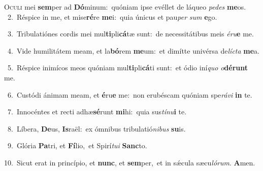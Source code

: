 \lettrine{\initial\textcolor{\initialcolor}{O}}{culi} mei \textbf{sem}\-per ad \textbf{Dó}\-minum:~\star quóniam ipse evéllet de láqueo \textit{pe}\-\textit{des} \textbf{me}\-os.\\
{\numbfont\textcolor{\numbcolor}{~2.}}~Réspice in me, et mise\-\textbf{ré}\-re \textbf{me}\-i:~\star quia únicus et pau\textit{per} \textit{sum} \textbf{e}\-go.\par
{\numbfont\textcolor{\numbcolor}{~3.}}~Tribulatiónes cordis mei mul\-\textbf{ti}\-pli\-\textbf{cá}\-tæ sunt:~\star de necessitátibus meis \textit{é}\-\textit{ru}\textbf{e} me.\par
{\numbfont\textcolor{\numbcolor}{~4.}}~Vide humilitátem meam, et la\-\textbf{bó}\-rem \textbf{me}\-um:~\star et dimítte univérsa de\-\textit{líc}\-\textit{ta} \textbf{me}\-a.\par
{\numbfont\textcolor{\numbcolor}{~5.}}~Réspice inimícos meos quóniam mul\-\textbf{ti}\-pli\-\textbf{cá}\-ti sunt:~\star et ódio iní\textit{quo} \textit{o}\-\textbf{dé}\textbf{runt} me.\par
{\numbfont\textcolor{\numbcolor}{~6.}}~Custódi ánimam meam, et \textbf{é}\-ru\textbf{e} me:~\star non erubéscam quóniam spe\-\textit{rá}\-\textit{vi} \textbf{in} te.\par
{\numbfont\textcolor{\numbcolor}{~7.}}~Innocéntes et recti adhæ\-\textbf{sé}\-runt \textbf{mi}\-hi:~\star quia sus\-\textit{tí}\-\textit{nu}\textbf{i} te.\par
{\numbfont\textcolor{\numbcolor}{~8.}}~Líbera, \textbf{De}\-us, \textbf{Is}\-raël:~\star ex ómnibus tribulatió\-\textit{ni}\-\textit{bus} \textbf{su}\-is.\par
{\numbfont\textcolor{\numbcolor}{~9.}}~Glória \textbf{Pa}\-tri, et \textbf{Fí}\-lio,~\star et Spirí\-\textit{tu}\-\textit{i} \textbf{Sanc}\-to.\par
{\numbfont\textcolor{\numbcolor}{10.}}~Sicut erat in princípio, et \textbf{nunc}\-, et \textbf{sem}\-per,~\star et in sǽcula sæcu\-\textit{ló}\-\textit{rum}. \textbf{A}\-men.\par
